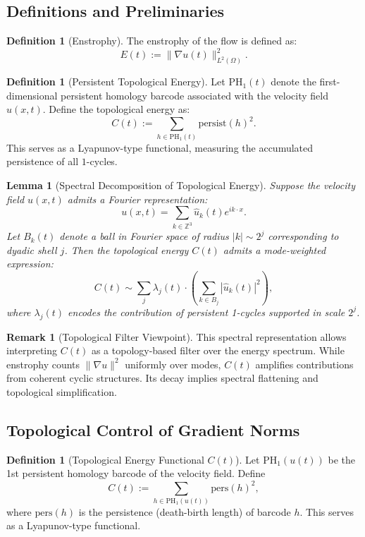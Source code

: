 \documentclass[11pt]{article}
\newtheorem{lemma}[theorem]{Lemma}
\theoremstyle{definition}
\newtheorem{definition}[theorem]{Definition}
\newtheorem{remark}[theorem]{Remark}
\begin{document}
\subsection{Definitions and Preliminaries}

\begin{definition}[Enstrophy]
The enstrophy of the flow is defined as:
\[
E(t) := \|\nabla u(t)\|_{L^2(\Omega)}^2.
\]
\end{definition}

\begin{definition}[Persistent Topological Energy]
Let $\mathrm{PH}_1(t)$ denote the first-dimensional persistent homology barcode associated with the velocity field $u(x,t)$. Define the topological energy as:
\[
C(t) := \sum_{h \in \mathrm{PH}_1(t)} \mathrm{persist}(h)^2.
\]
This serves as a Lyapunov-type functional, measuring the accumulated persistence of all $1$-cycles.
\end{definition}

\begin{lemma}[Spectral Decomposition of Topological Energy]
Suppose the velocity field $u(x,t)$ admits a Fourier representation:
\[
u(x,t) = \sum_{k \in \mathbb{Z}^3} \hat{u}_k(t) e^{i k \cdot x}.
\]
Let $B_k(t)$ denote a ball in Fourier space of radius $|k| \sim 2^j$ corresponding to dyadic shell $j$. Then the topological energy $C(t)$ admits a mode-weighted expression:
\[
C(t) \sim \sum_{j} \lambda_j(t) \cdot \left(\sum_{k \in B_j} |\hat{u}_k(t)|^2\right),
\]
where $\lambda_j(t)$ encodes the contribution of persistent 1-cycles supported in scale $2^j$.
\end{lemma}

\begin{remark}[Topological Filter Viewpoint]
This spectral representation allows interpreting $C(t)$ as a topology-based filter over the energy spectrum. While enstrophy counts $\|\nabla u\|^2$ uniformly over modes, $C(t)$ amplifies contributions from coherent cyclic structures. Its decay implies spectral flattening and topological simplification.
\end{remark}

\subsection{Topological Control of Gradient Norms}

\begin{definition}[Topological Energy Functional $C(t)$]
Let $\mathrm{PH}_1(u(t))$ be the 1st persistent homology barcode of the velocity field. Define
\[
C(t) := \sum_{h \in \mathrm{PH}_1(u(t))} \mathrm{pers}(h)^2,
\]
where $\mathrm{pers}(h)$ is the persistence (death-birth length) of barcode $h$. This serves as a Lyapunov-type functional.
\end{definition}
\end{document}
